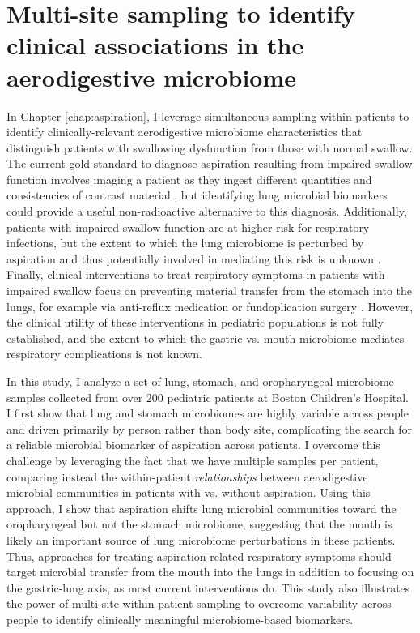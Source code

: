 \section{Multi-site sampling to identify clinical associations in the aerodigestive microbiome}

In Chapter \ref{chap:aspiration}, I leverage simultaneous sampling within patients to identify clinically-relevant aerodigestive microbiome characteristics that distinguish patients with swallowing dysfunction from those with normal swallow.
The current gold standard to diagnose aspiration resulting from impaired swallow function involves imaging a patient as they ingest different quantities and consistencies of contrast material \cite{cook-1999-dysphagia}, but identifying lung microbial biomarkers could provide a useful non-radioactive alternative to this diagnosis.
Additionally, patients with impaired swallow function are at higher risk for respiratory infections, but the extent to which the lung microbiome is perturbed by aspiration and thus potentially involved in mediating this risk is unknown \cite{cook-1999-dysphagia,thomson-2016-asppneumo}.
Finally, clinical interventions to treat respiratory symptoms in patients with impaired swallow focus on preventing material transfer from the stomach into the lungs, for example via anti-reflux medication or fundoplication surgery \cite{goldin-2006-fundo,lee-2008-fundo}.
However, the clinical utility of these interventions in pediatric populations is not fully established, and the extent to which the gastric vs. mouth microbiome mediates respiratory complications is not known.

In this study, I analyze a set of lung, stomach, and oropharyngeal microbiome samples collected from over 200 pediatric patients at Boston Children's Hospital.
I first show that lung and stomach microbiomes are highly variable across people and driven primarily by person rather than body site, complicating the search for a reliable microbial biomarker of aspiration across patients.
I overcome this challenge by leveraging the fact that we have multiple samples per patient, comparing instead the within-patient \textit{relationships} between aerodigestive microbial communities in patients with vs. without aspiration.
Using this approach, I show that aspiration shifts lung microbial communities toward the oropharyngeal but not the stomach microbiome, suggesting that the mouth is likely an important source of lung microbiome perturbations in these patients.
Thus, approaches for treating aspiration-related respiratory symptoms should target microbial transfer from the mouth into the lungs in addition to focusing on the gastric-lung axis, as most current interventions do.
This study also illustrates the power of multi-site within-patient sampling to overcome variability across people to identify clinically meaningful microbiome-based biomarkers.

